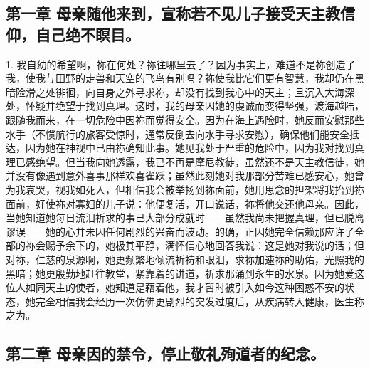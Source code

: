 
\subsection{第一章 母亲随他来到，宣称若不见儿子接受天主教信仰，自己绝不瞑目。}

1. 我自幼的希望啊，祢在何处？祢往哪里去了？因为事实上，难道不是祢创造了我，使我与田野的走兽和天空的飞鸟有别吗？祢使我比它们更有智慧，我却仍在黑暗险滑之处徘徊，向自身之外寻求祢，却没有找到我心中的天主；且沉入大海深处，怀疑并绝望于找到真理。这时，我的母亲因她的虔诚而变得坚强，渡海越陆，跟随我而来，在一切危险中因祢而觉得安全。因为在海上遇险时，她反而安慰那些水手（不惯航行的旅客受惊时，通常反倒去向水手寻求安慰），确保他们能安全抵达，因为她在神视中已由祢确知此事。她见我处于严重的危险中，因为我对找到真理已感绝望。但当我向她透露，我已不再是摩尼教徒，虽然还不是天主教信徒，她并没有像遇到意外喜事那样欢喜雀跃；虽然此刻她对我那部分苦难已感安心，她曾为我哀哭，视我如死人，但相信我会被举扬到祢面前，她用思念的担架将我抬到祢面前，好使祢对寡妇的儿子说：他便复活，开口说话，祢将他交还他母亲。因此，当她知道她每日流泪祈求的事已大部分成就时——虽然我尚未把握真理，但已脱离谬误——她的心并未因任何剧烈的兴奋而波动。的确，正因她完全信赖那应许了全部的祢会赐予余下的，她极其平静，满怀信心地回答我说：这是她对我说的话；但对祢，仁慈的泉源啊，她更频繁地倾流祈祷和眼泪，求祢加速祢的助佑，光照我的黑暗；她更殷勤地赶往教堂，紧靠着的讲道，祈求那涌到永生的水泉。因为她爱这位人如同天主的使者，她知道是藉着他，我才暂时被引入如今这种困惑不安的状态，她完全相信我会经历一次仿佛更剧烈的突发过度后，从疾病转入健康，医生称之为。\par


\subsection{第二章 母亲因的禁令，停止敬礼殉道者的纪念。}


